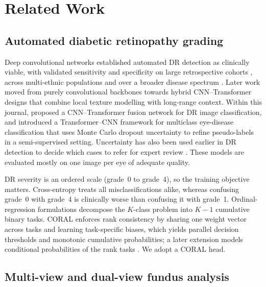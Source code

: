 \documentclass[final,5p,times,twocolumn,authoryear]{elsarticle}
\theoremstyle{plain}
\theoremstyle{remark}
\begin{document}
\section{Related Work}
\label{sec:related}

\subsection{Automated diabetic retinopathy grading}
\label{sec:rw-dr}

Deep convolutional networks established automated DR detection as clinically viable, with validated sensitivity and specificity on large retrospective cohorts \citep{Gulshan2016,Gargeya2017}, across multi-ethnic populations \citep{Ting2017} and over a broader disease spectrum \citep{Dai2021}. Later work moved from purely convolutional backbones towards hybrid CNN--Transformer designs that combine local texture modelling with long-range context. Within this journal, \citet{Huang2025drctfn} proposed a CNN--Transformer fusion network for DR image classification, and \citet{Malik2026uncertainty} introduced a Transformer--CNN framework for multiclass eye-disease classification that uses Monte Carlo dropout uncertainty to refine pseudo-labels in a semi-supervised setting. Uncertainty has also been used earlier in DR detection to decide which cases to refer for expert review \citep{Leibig2017uncertainty}. These models are evaluated mostly on one image per eye of adequate quality.

DR severity is an ordered scale (grade~0 to grade~4), so the training objective matters. Cross-entropy treats all misclassifications alike, whereas confusing grade~0 with grade~4 is clinically worse than confusing it with grade~1. Ordinal-regression formulations decompose the $K$-class problem into $K-1$ cumulative binary tasks. CORAL \citep{Cao2020coral} enforces rank consistency by sharing one weight vector across tasks and learning task-specific biases, which yields parallel decision thresholds and monotonic cumulative probabilities; a later extension models conditional probabilities of the rank tasks \citep{Shi2022coral}. We adopt a CORAL head.

\subsection{Multi-view and dual-view fundus analysis}
\label{sec:rw-multiview}
\end{document}
